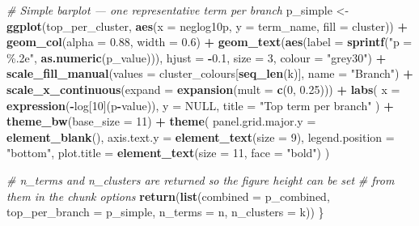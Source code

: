 \documentclass[
]{book}
\newenvironment{Shaded}{\begin{snugshade}}{\end{snugshade}}
\newcommand{\AttributeTok}[1]{\textcolor[rgb]{0.13,0.29,0.53}{#1}}
\newcommand{\CommentTok}[1]{\textcolor[rgb]{0.56,0.35,0.01}{\textit{#1}}}
\newcommand{\ConstantTok}[1]{\textcolor[rgb]{0.56,0.35,0.01}{#1}}
\newcommand{\DecValTok}[1]{\textcolor[rgb]{0.00,0.00,0.81}{#1}}
\newcommand{\FloatTok}[1]{\textcolor[rgb]{0.00,0.00,0.81}{#1}}
\newcommand{\FunctionTok}[1]{\textcolor[rgb]{0.13,0.29,0.53}{\textbf{#1}}}
\newcommand{\NormalTok}[1]{#1}
\newcommand{\OtherTok}[1]{\textcolor[rgb]{0.56,0.35,0.01}{#1}}
\newcommand{\SpecialCharTok}[1]{\textcolor[rgb]{0.81,0.36,0.00}{\textbf{#1}}}
\newcommand{\StringTok}[1]{\textcolor[rgb]{0.31,0.60,0.02}{#1}}
\begin{document}
\begin{Shaded}
\begin{Highlighting}[]
  \CommentTok{\#  Simple barplot — one representative term per branch }
\NormalTok{  p\_simple }\OtherTok{\textless{}{-}} \FunctionTok{ggplot}\NormalTok{(top\_per\_cluster,}
                     \FunctionTok{aes}\NormalTok{(}\AttributeTok{x =}\NormalTok{ neglog10p, }\AttributeTok{y =}\NormalTok{ term\_name, }\AttributeTok{fill =}\NormalTok{ cluster)) }\SpecialCharTok{+}
    \FunctionTok{geom\_col}\NormalTok{(}\AttributeTok{alpha =} \FloatTok{0.88}\NormalTok{, }\AttributeTok{width =} \FloatTok{0.6}\NormalTok{) }\SpecialCharTok{+}
    \FunctionTok{geom\_text}\NormalTok{(}\FunctionTok{aes}\NormalTok{(}\AttributeTok{label =} \FunctionTok{sprintf}\NormalTok{(}\StringTok{"p = \%.2e"}\NormalTok{, }\FunctionTok{as.numeric}\NormalTok{(p\_value))),}
              \AttributeTok{hjust =} \SpecialCharTok{{-}}\FloatTok{0.1}\NormalTok{, }\AttributeTok{size =} \DecValTok{3}\NormalTok{, }\AttributeTok{colour =} \StringTok{"grey30"}\NormalTok{) }\SpecialCharTok{+}
    \FunctionTok{scale\_fill\_manual}\NormalTok{(}\AttributeTok{values =}\NormalTok{ cluster\_colours[}\FunctionTok{seq\_len}\NormalTok{(k)],}
                      \AttributeTok{name   =} \StringTok{"Branch"}\NormalTok{) }\SpecialCharTok{+}
    \FunctionTok{scale\_x\_continuous}\NormalTok{(}\AttributeTok{expand =} \FunctionTok{expansion}\NormalTok{(}\AttributeTok{mult =} \FunctionTok{c}\NormalTok{(}\DecValTok{0}\NormalTok{, }\FloatTok{0.25}\NormalTok{))) }\SpecialCharTok{+}
    \FunctionTok{labs}\NormalTok{(}
      \AttributeTok{x     =} \FunctionTok{expression}\NormalTok{(}\SpecialCharTok{{-}}\NormalTok{log[}\DecValTok{10}\NormalTok{](p}\SpecialCharTok{{-}}\NormalTok{value)),}
      \AttributeTok{y     =} \ConstantTok{NULL}\NormalTok{,}
      \AttributeTok{title =} \StringTok{"Top term per branch"}
\NormalTok{    ) }\SpecialCharTok{+}
    \FunctionTok{theme\_bw}\NormalTok{(}\AttributeTok{base\_size =} \DecValTok{11}\NormalTok{) }\SpecialCharTok{+}
    \FunctionTok{theme}\NormalTok{(}
      \AttributeTok{panel.grid.major.y =} \FunctionTok{element\_blank}\NormalTok{(),}
      \AttributeTok{axis.text.y        =} \FunctionTok{element\_text}\NormalTok{(}\AttributeTok{size =} \DecValTok{9}\NormalTok{),}
      \AttributeTok{legend.position    =} \StringTok{"bottom"}\NormalTok{,}
      \AttributeTok{plot.title         =} \FunctionTok{element\_text}\NormalTok{(}\AttributeTok{size =} \DecValTok{11}\NormalTok{, }\AttributeTok{face =} \StringTok{"bold"}\NormalTok{)}
\NormalTok{    )}

  \CommentTok{\# n\_terms and n\_clusters are returned so the figure height can be set}
  \CommentTok{\# from them in the chunk options}
  \FunctionTok{return}\NormalTok{(}\FunctionTok{list}\NormalTok{(}\AttributeTok{combined =}\NormalTok{ p\_combined, }\AttributeTok{top\_per\_branch =}\NormalTok{ p\_simple,}
              \AttributeTok{n\_terms =}\NormalTok{ n, }\AttributeTok{n\_clusters =}\NormalTok{ k))}
\NormalTok{\}}
\end{Highlighting}
\end{Shaded}
\end{document}

